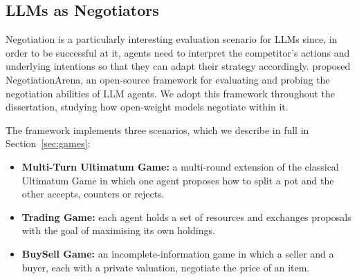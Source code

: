 \subsection{LLMs as Negotiators} \label{sec:llm-negotiators}

Negotiation is a particularly interesting evaluation scenario for \acp{LLM} since, in order to be successful at it, agents need to interpret the competitor's actions and underlying intentions so that they can adapt their strategy accordingly. \textcite{bianchi_how_2024} proposed NegotiationArena, an open-source framework for evaluating and probing the negotiation abilities of \ac{LLM} agents. We adopt this framework throughout the dissertation, studying how open-weight models negotiate within it.

The framework implements three scenarios, which we describe in full in Section~\ref{sec:games}: 
\begin{itemize}
    \item \textbf{Multi-Turn Ultimatum Game:} a multi-round extension of the classical Ultimatum Game in which one agent proposes how to split a pot and the other accepts, counters or rejects.

    \item \textbf{Trading Game:} each agent holds a set of resources and exchanges proposals with the goal of maximising its own holdings.

    \item \textbf{BuySell Game:} an incomplete-information game in which a seller and a buyer, each with a private valuation, negotiate the price of an item.
\end{itemize}

